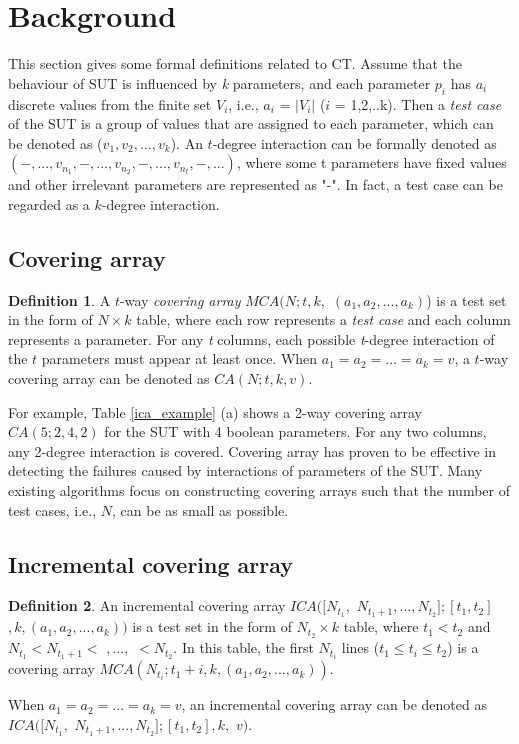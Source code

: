 \documentclass[conference]{IEEEtran}
\theoremstyle{definition}
\newtheorem{definition}{Definition}
\begin{document}
\section{Background}
This section gives some formal definitions related to CT. Assume that the behaviour of SUT is influenced by \emph{k} parameters, and each parameter $p_{i}$ has $a_{i}$ discrete values from the finite set $V_{i}$, i.e., $a_{i}$ = $|V_{i}|$ ($i$ = 1,2,..k). Then a \emph{test case} of the SUT is a group of values that are assigned to each parameter, which can be denoted as ($v_{1}, v_{2}, ..., v_{k}$). An $t$-degree interaction can be formally denoted as $(-, ..., v_{n_{1}}, -, ..., v_{n_{2}},-, ...,v_{n_{t}}, -, ...)$, where some t parameters have fixed values and other irrelevant parameters are represented as "-". In fact, a test case can be regarded as a $k$-degree interaction.


\subsection{Covering array}

\begin{definition}A $t$-way \emph{covering array} $MCA(N; t, k,$ $(a_{1}, a_{2}, ..., a_{k})$) is a test set in the form of $N \times k$ table, where each row represents a \emph{test case} and each column represents a parameter.  For any \emph{t} columns, each possible \emph{t}-degree interaction of the $t$ parameters must appear at least once. When $ a_{1} = a_{2} = ... = a_{k} = v $, a $t$-way covering array can be denoted as $CA(N; t, k, v)$.
\end{definition}


For example, Table \ref{ica_example} (a) shows a 2-way covering array $CA(5;2,4,2)$ for the SUT with 4 boolean parameters. For any two columns, any 2-degree interaction is covered.  Covering array has proven to be effective in detecting the failures caused by interactions of parameters of the SUT. Many existing algorithms focus on constructing covering arrays such that the number of test cases, i.e., $N$, can be as small as possible.


\subsection{Incremental covering array}

\begin{definition}
An incremental covering array $ICA([N_{t_{1}},$ $N_{t_{1} + 1},...,N_{t_{2}}];[t_{1},t_{2}]$ $, k, (a_{1},a_{2},...,a_{k}))$ is a test set in the form of $N_{t_{2}} \times k$ table, where $t_{1} < t_{2}$ and  $N_{t_{1}}<N_{t_{1} + 1} <$ $,...,$ $< N_{t_{2}}$.  In this table, the first $N_{t_{i}}$ lines ($t_{1}\leq t_{i} \leq t_{2}$) is a covering array $MCA(N_{t_{i}}; t_{1} + i, k , (a_{1},a_{2},...,a_{k}))$.

 When $ a_{1} = a_{2} = ... = a_{k} = v $, an incremental covering array can be denoted as $ICA([N_{t_{1}},$ $N_{t_{1} + 1},...,N_{t_{2}}];[t_{1},t_{2}], k,$ $ v)$.
\end{definition}
\end{document}
